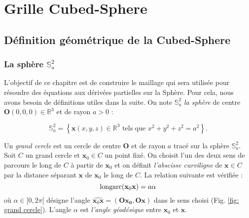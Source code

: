 \chapter{Grille Cubed-Sphere}
\label{chap:3}

\section{Définition géométrique de la Cubed-Sphere}

\subsection{La sphère $\mathbb{S}_a^2$}

L'objectif de ce chapitre est de construire le maillage qui sera utilisée pour résoudre des équations aux dérivées partielles sur la Sphère. Pour cela, nous avons besoin de définitions utiles dans la suite. On note $\mathbb{S}_a^2$ \textit{la sphère} de centre $\mathbf{O} (0,0,0) \in \mathbb{R}^3$ et de rayon $a>0$ :

\begin{equation}
\mathbb{S}_a^2 = \left\lbrace
\mathbf{x} (x,y,z) \in \mathbb{R}^3 \text{ tels que } x^2+y^2+z^2 = a^2
\right\rbrace.
\end{equation} 

Un \textit{grand cercle} est un cercle de centre $\mathbf{O}$ et de rayon $a$ tracé sur la sphère $\mathbb{S}_a^2$.
Soit $C$ un grand cercle et $\mathbf{x}_0 \in C$ un point fixé. On choisit l'un des deux sens de parcours le long de $C$ à partir de $\mathbf{x}_0$ et on définit \textit{l'abscisse curviligne} de $\mathbf{x} \in C$ par la distance séparant $\mathbf{x}$ de $\mathbf{x}_0$ le long de $C$. La relation suivante est vérifiée :
\begin{equation}
\text{longarc}(\mathbf{x}_0  \mathbf{x}) = a \alpha
\end{equation}
où $\alpha \in [ 0, 2 \pi[$ désigne l'angle $\widehat{\mathbf{x}_0 \mathbf{x}} = (\mathbf{Ox_0}, \mathbf{Ox})$ dans le sens choisi (Fig. \ref{fig: grand cercle}). L'angle $\alpha$ est \textit{l'angle géodésique} entre $\mathbf{x}_0$ et $\mathbf{x}$.

